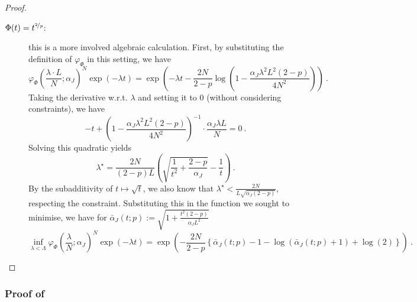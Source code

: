\documentclass[11pt]{article}
\newcounter{ct}
\begin{document}
\begin{proof}
\begin{description}
\item [\(\Phi(t) = t^{\nicefrac{2}{p}}\): ] this is a more involved algebraic calculation.
First, by substituting the definition of \(\varphi_{\Phi}\) in this setting, we have
\begin{equation*}
    \varphi_{\Phi}\left(\frac{\lambda \cdot L}{N}; \alpha_{J}\right)^{N} \exp(-\lambda t) = \exp\left(-\lambda t - \frac{2N}{2 - p}\log\left(1 - \frac{\alpha_{J}\lambda^{2}L^{2}(2 - p)}{4N^{2}}\right)\right)~.
\end{equation*}
Taking the derivative w.r.t. \(\lambda\) and setting it to \(0\) (without considering constraints), we have
\begin{equation*}
    -t + \left(1 - \frac{\alpha_{J}\lambda^{2}L^{2}(2 - p)}{4N^{2}}\right)^{-1}\cdot \frac{\alpha_{J}\lambda L}{N} =0~.
\end{equation*}
Solving this quadratic yields
\begin{equation*}
    \lambda^{\star} = \frac{2N}{(2 - p)L}\left(\sqrt{\frac{1}{t^{2}} + \frac{2 - p}{\alpha_{J}}} - \frac{1}{t}\right)~.
\end{equation*}
By the subadditivity of \(t \mapsto \sqrt{t}\), we also know that \(\lambda^{\star} < \frac{2N}{L\sqrt{\alpha_{J}(2 - p)}}\), respecting the constraint.
Substituting this in the function we sought to minimise, we have for \(\bar{\alpha}_{J}(t; p) := \sqrt{1 + \frac{t^{2}(2 - p)}{\alpha_{J}L^{2}}}\)
\begin{equation*}
    \inf_{\lambda < \Lambda}  \varphi_{\Phi}\left(\frac{\lambda}{N}; \alpha_{J}\right)^{N} \exp(-\lambda t) = \exp\left(-\frac{2N}{2 - p}\left\{\bar{\alpha}_{J}(t; p) - 1 - \log(\bar{\alpha}_{J}(t; p) + 1) + \log(2)\right\}\right)~.
\end{equation*}
\end{description}
\end{proof}

\subsubsection{Proof of }
\label{sec:prf:scheme2-chernoff}
\end{document}
